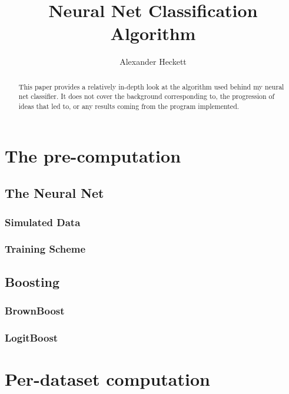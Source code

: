 \documentclass[twocolumn, 12pt]{article}
\begin{document}
\title{Neural Net Classification Algorithm}
\author{Alexander Heckett}
\maketitle
\begin{abstract}
\indent \indent This paper provides a relatively in-depth look at the algorithm used behind my neural net classifier. It does not cover the background corresponding to, the progression of ideas that led to, or any results coming from the program implemented. 
\end{abstract}
\tableofcontents
\section{The pre-computation}
\subsection{The Neural Net}
\subsubsection{Simulated Data}
\subsubsection{Training Scheme}
\subsection{Boosting}
\subsubsection{BrownBoost}
\subsubsection{LogitBoost}
\section{Per-dataset computation}
\end{document}
